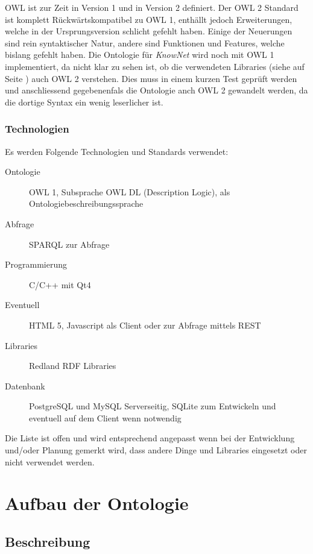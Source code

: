 \documentclass[draft,
    11pt,
    latin1,
    a4paper,
    oneside
]{scrreprt}
\let\oldemph=\emph
\renewcommand{\emph}[1]{\index{#1}\oldemph{#1}}
\begin{document}
OWL ist zur Zeit in Version 1 und in Version 2 definiert. Der OWL 2 Standard\cite{W3COWL2} ist komplett R\"uckw\"artskompatibel zu OWL 1, enth\"allt jedoch Erweiterungen, welche in der Ursprungsversion schlicht gefehlt haben. Einige der Neuerungen sind rein syntaktischer Natur, andere sind Funktionen und Features, welche bislang gefehlt haben. Die Ontologie f\"ur \emph{KnowNet} wird noch mit OWL 1 implementiert, da nicht klar zu sehen ist, ob die verwendeten Libraries (siehe  auf Seite \pageref{sec:technologies}) auch OWL 2 verstehen. Dies muss in einem kurzen Test gepr\"uft werden und anschliessend gegebenenfals die Ontologie anch OWL 2 gewandelt werden, da die dortige Syntax ein wenig leserlicher ist.

\subsection{Technologien} \label{sec:technologies}

Es werden Folgende Technologien und Standards verwendet:

\begin{description}
  \item[Ontologie] OWL 1, Subsprache OWL DL (Description Logic), als Ontologiebeschreibungssprache
  \item[Abfrage] SPARQL\cite{SPARQL} zur Abfrage
  \item[Programmierung] C/C++ mit Qt4\cite{QT}
  \item[Eventuell] HTML 5, Javascript als Client oder zur Abfrage mittels REST
  \item[Libraries] Redland RDF Libraries\cite{LIBRDF}
  \item[Datenbank] PostgreSQL und MySQL Serverseitig, SQLite zum Entwickeln und eventuell auf dem Client wenn notwendig
\end{description}

Die Liste ist offen und wird entsprechend angepasst wenn bei der Entwicklung und/oder Planung gemerkt wird, dass andere Dinge und Libraries eingesetzt oder nicht verwendet werden.

\chapter{Aufbau der Ontologie} \label{sec:ontology}


\section{Beschreibung} \label{sec:description}
\end{document}

